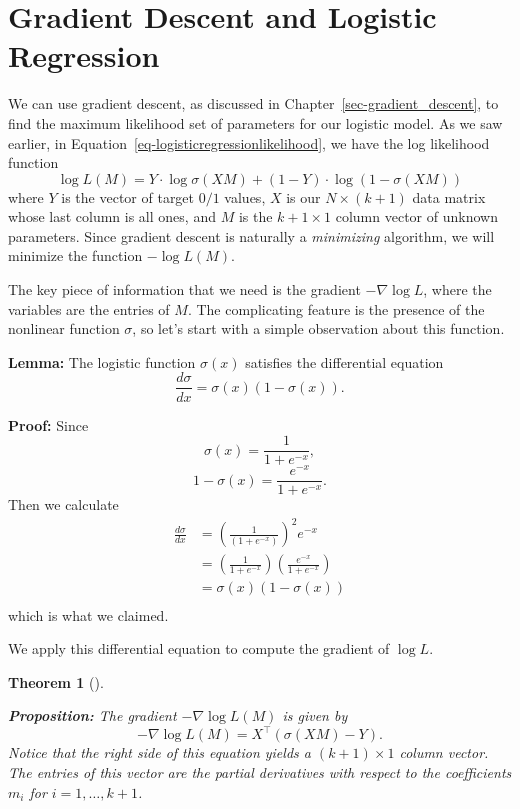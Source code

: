 \documentclass[
  11pt,
  letterpaper,
]{scrbook}
\theoremstyle{plain}
\newtheorem{theorem}{Theorem}[chapter]
\theoremstyle{remark}
\begin{document}
\hypertarget{gradient-descent-and-logistic-regression}{%
\section{Gradient Descent and Logistic
Regression}\label{gradient-descent-and-logistic-regression}}

We can use gradient descent, as discussed in
Chapter~\ref{sec-gradient_descent}, to find the maximum likelihood set
of parameters for our logistic model. As we saw earlier, in
Equation~\ref{eq-logisticregressionlikelihood}, we have the log
likelihood function \[
\log L(M) = Y\cdot \log\sigma(XM) + (1-Y)\cdot\log(1-\sigma(XM))
\] where \(Y\) is the vector of target \(0/1\) values, \(X\) is our
\(N\times (k+1)\) data matrix whose last column is all ones, and \(M\)
is the \(k+1\times 1\) column vector of unknown parameters. Since
gradient descent is naturally a \emph{minimizing} algorithm, we will
minimize the function \(-\log L(M)\).

The key piece of information that we need is the gradient
\(-\nabla \log L\), where the variables are the entries of \(M\). The
complicating feature is the presence of the nonlinear function
\(\sigma\), so let's start with a simple observation about this
function.

\textbf{Lemma:} The logistic function \(\sigma(x)\) satisfies the
differential equation \[
\frac{d\sigma}{dx} = \sigma(x)(1-\sigma(x)).
\]

\textbf{Proof:} Since \[
\sigma(x)= \frac{1}{1+e^{-x}},
\] \[
1-\sigma(x) = \frac{e^{-x}}{1+e^{-x}}.
\] Then we calculate \[\begin{aligned}
\frac{d\sigma}{dx}&=\left(\frac{1}{(1+e^{-x})}\right)^2e^{-x} \\
                  &= \left(\frac{1}{1+e^{-x}}\right)\left(\frac{e^{-x}}{1+e^{-x}}\right)\\
                  &=\sigma(x)(1-\sigma(x)) \\
\end{aligned}
\] which is what we claimed.

We apply this differential equation to compute the gradient of
\(\log L\).

\begin{theorem}[]\protect\hypertarget{thm-logisticgradient}{}\label{thm-logisticgradient}

\textbf{Proposition:} The gradient \(-\nabla \log L(M)\) is given by \[
-\nabla \log L(M) = X^{\intercal}(\sigma(XM)-Y).
\] Notice that the right side of this equation yields a
\((k+1)\times 1\) column vector. The entries of this vector are the
partial derivatives with respect to the coefficients \(m_{i}\) for
\(i=1,\ldots, k+1\).

\end{theorem}
\end{document}
